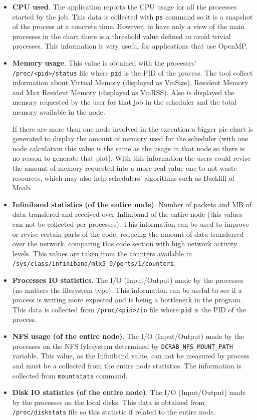 \documentclass[10pt,a4paper]{report}
\begin{document}
\begin{itemize}
	\item \textbf{CPU used}. The application reports the CPU usage for all the processes started by the job. This data is collected with \verb+ps+ command so it is a snapshot of the process at a concrete time. However, to have only a view of the main processes in the chart there is a threshold value defined to avoid trivial processes. This information is very useful for applications that use OpenMP.
	\item \textbf{Memory usage}. This value is obtained with the processes' \verb+/proc/<pid>/status+ file where \verb+pid+ is the PID of the process. The tool collect information about Virtual Memory (displayed as VmSize), Resident Memory and Max Resident Memory (displayed as VmRSS). Also is displayed the memory requested by the user for that job in the scheduler and the total memory available in the node.

	If there are more than one node involved in the execution a bigger pie chart is generated to display the amount of memory used for the scheduler (with one node calculation this value is the same as the usage in that node so there is no reason to generate that plot). With this information the users could revise the amount of memory requested into a more real value one to not waste resources, which may also help schedulers' algorithms such as Backfill of Moab.
	\item \textbf{Infiniband statistics (of the entire node)}. Number of packets and MB of data transfered and received over Infiniband of the entire node (this values can not be collected per processes). This information can be used to improve or revise certain parts of the code, reducing the amount of data transferred over the network, comparing this code section with high network activity levels. This values are taken from the counters available in \verb+/sys/class/infiniband/mlx5_0/ports/1/counters+.
	\item \textbf{Processes IO statistics}. The I/O (Input/Output) made by the processes (no matters the filesystem type). This information can be useful to see if a process is writing more expected and is being a bottleneck in the program. This data is collected from \verb+/proc/<pid>/io+ file where \verb+pid+ is the PID of the process.
	\item \textbf{NFS usage (of the entire node)}. The I/O (Input/Output) made by the processes on the NFS fylesystem determined by \verb+DCRAB_NFS_MOUNT_PATH+ variable. This value, as the Infiniband value, can not be measured by process and must be a collected from the entire node statistics. The information is collected from \verb+mountstats+ command.
	\item \textbf{Disk IO statistics (of the entire node)}. The I/O (Input/Output) made by the processes on the local disks. This data is obtained from \verb+/proc/diskstats+ file so this statistic if related to the entire node.
\end{itemize}
\end{document}
